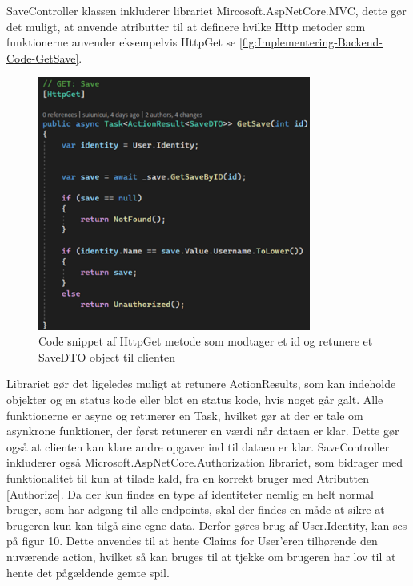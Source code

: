 SaveController klassen inkluderer librariet Mircosoft.AspNetCore.MVC, dette gør det muligt, at anvende atributter til at definere hvilke Http metoder som funktionerne anvender eksempelvis HttpGet se \autoref{fig:Implementering-Backend-Code-GetSave}.

\begin{figure}[H]
\centering
\includegraphics[width = 0.8\textwidth]{02-Body/Images/Backend_Code_GetSave.PNG}
\caption{Code snippet af HttpGet metode som modtager et id og retunere et SaveDTO object til clienten}
\label{fig:Implementering-Backend-Code-GetSave}
\end{figure}

Librariet gør det ligeledes muligt at retunere ActionResults, som kan indeholde objekter og en status kode eller blot en status kode, hvis noget går galt. Alle funktionerne er async og retunerer en Task, hvilket gør at der er tale om asynkrone funktioner, der først retunerer en værdi når dataen er klar. Dette gør også at clienten kan klare andre opgaver ind til dataen er klar.
SaveController inkluderer også Microsoft.AspNetCore.Authorization librariet, som bidrager med funktionalitet til kun at tilade kald, fra en korrekt bruger med Atributten [Authorize]. Da der kun findes en type af identiteter nemlig en helt normal bruger, som har adgang til alle endpoints, skal der findes en måde at sikre at brugeren kun kan tilgå sine egne data. Derfor gøres brug af User.Identity, kan ses på figur 10. Dette anvendes til at hente Claims for User'eren tilhørende den nuværende action, hvilket så kan bruges til at tjekke om brugeren har lov til at hente det pågældende gemte spil.\\
    

